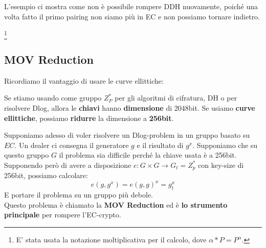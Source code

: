 \begin{remark}
L'esempio ci mostra come non è possibile rompere DDH nuovamente, poiché una volta fatto il primo pairing non siamo più in EC e non possiamo tornare indietro.
\end{remark}
\footnote{E' stata usata la notazione moltiplicativa per il calcolo, dove $\alpha*P=P^\alpha$.}
\subsection{MOV Reduction}
Ricordiamo il vantaggio di usare le curve ellittiche:
\begin{property}Se stiamo usando come gruppo $Z^*_P$ per gli algoritmi di cifratura, DH o per risolvere Dlog, allora le \textbf{chiavi} hanno \textbf{dimensione} di 2048bit. Se usiamo \textbf{curve ellittiche}, possiamo \textbf{ridurre} la dimensione a \textbf{256bit}.  
\end{property}
Supponiamo adesso di voler risolvere un Dlog-problem in un gruppo basato su $EC$. Un dealer ci consegna il generatore $g$ e il risultato di $g^x$. Supponiamo che su questo gruppo $G$ il problema sia difficile perché la chiave usata è a 256bit. \\
Supponendo però di avere a disposizione $e:G\times G\longrightarrow G_t=Z_p^*$ con key-size di 256bit, possiamo calcolare:
\[e(g,g^x)=e(g,g)^x=g^x_t\]
E portare il problema su un gruppo più debole.\\
Questo problema è chiamato la \textbf{MOV Reduction} ed è \textbf{lo strumento principale} per rompere l'EC-crypto. 
